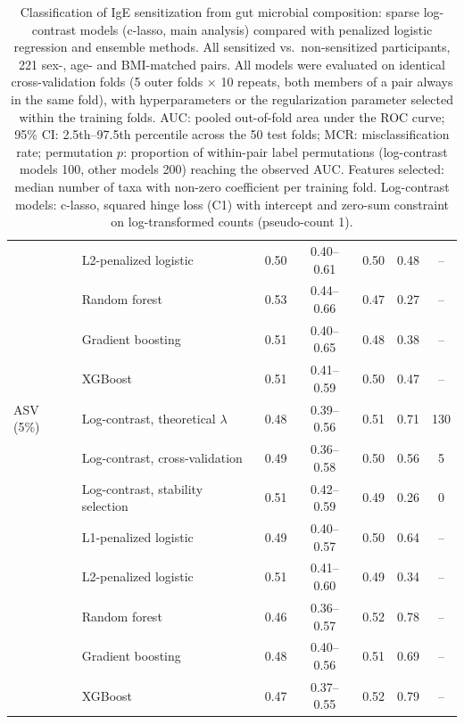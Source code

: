 \begin{table}[h!]
\begin{tabular}{l l c c c c c}
 & L2-penalized logistic & 0.50 & 0.40--0.61 & 0.50 & 0.48 & -- \\
 & Random forest & 0.53 & 0.44--0.66 & 0.47 & 0.27 & -- \\
 & Gradient boosting & 0.51 & 0.40--0.65 & 0.48 & 0.38 & -- \\
 & XGBoost & 0.51 & 0.41--0.59 & 0.50 & 0.47 & -- \\
\hline
ASV (5\%) & Log-contrast, theoretical $\lambda$ & 0.48 & 0.39--0.56 & 0.51 & 0.71 & 130 \\
 & Log-contrast, cross-validation & 0.49 & 0.36--0.58 & 0.50 & 0.56 & 5 \\
 & Log-contrast, stability selection & 0.51 & 0.42--0.59 & 0.49 & 0.26 & 0 \\
 & L1-penalized logistic & 0.49 & 0.40--0.57 & 0.50 & 0.64 & -- \\
 & L2-penalized logistic & 0.51 & 0.41--0.60 & 0.49 & 0.34 & -- \\
 & Random forest & 0.46 & 0.36--0.57 & 0.52 & 0.78 & -- \\
 & Gradient boosting & 0.48 & 0.40--0.56 & 0.51 & 0.69 & -- \\
 & XGBoost & 0.47 & 0.37--0.55 & 0.52 & 0.79 & -- \\
\hline
\end{tabular}
\caption{Classification of IgE sensitization from gut microbial composition: sparse log-contrast models (c-lasso, main analysis) compared with penalized logistic regression and ensemble methods. All sensitized vs.\ non-sensitized participants, 221 sex-, age- and BMI-matched pairs. All models were evaluated on identical cross-validation folds (5 outer folds $\times$ 10 repeats, both members of a pair always in the same fold), with hyperparameters or the regularization parameter selected within the training folds. AUC: pooled out-of-fold area under the ROC curve; 95\% CI: 2.5th--97.5th percentile across the 50 test folds; MCR: misclassification rate; permutation $p$: proportion of within-pair label permutations (log-contrast models 100, other models 200) reaching the observed AUC. Features selected: median number of taxa with non-zero coefficient per training fold. Log-contrast models: c-lasso, squared hinge loss (C1) with intercept and zero-sum constraint on log-transformed counts (pseudo-count 1).\label{tab:ml_benchmark}}
\end{table}
